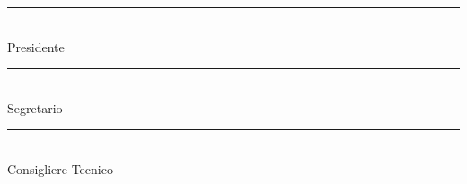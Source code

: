 \vspace{3cm}
\noindent\rule{7cm}{0.4pt} \\
[Nome Cognome] Presidente

\vspace{3cm}
\noindent\rule{7cm}{0.4pt} \\
[Nome Cognome] Segretario

\vspace{3cm}
\noindent\rule{7cm}{0.4pt} \\
[Nome Cognome] Consigliere Tecnico
